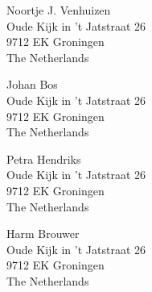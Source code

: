\documentclass{salt}
\begin{document}




\begin{addresses}
  \begin{address}
    Noortje J. Venhuizen \\
    Oude Kijk in 't Jatstraat 26\\
    9712 EK Groningen\\
    The Netherlands \\
  \end{address}
  \begin{address}
    Johan Bos \\
    Oude Kijk in 't Jatstraat 26\\
    9712 EK Groningen\\
    The Netherlands \\
  \end{address}
  \begin{address}
    Petra Hendriks \\
    Oude Kijk in 't Jatstraat 26\\
    9712 EK Groningen\\
    The Netherlands \\
  \end{address}
  \begin{address}
    Harm Brouwer \\
    Oude Kijk in 't Jatstraat 26\\
    9712 EK Groningen\\
    The Netherlands \\
  \end{address}
\end{addresses}

\end{document}
